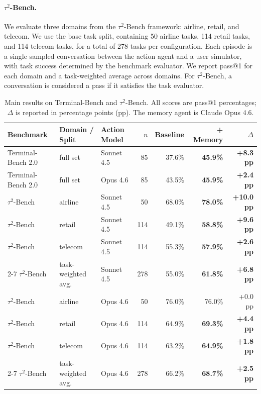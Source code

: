 \paragraph{$\tau^2$-Bench.}
We evaluate three domains from the $\tau^2$-Bench framework: airline, retail, and
telecom. We use the base task split, containing 50 airline tasks, 114 retail
tasks, and 114 telecom tasks, for a total of 278 tasks per configuration. Each
episode is a single sampled conversation between the action agent and a user
simulator, with task success determined by the benchmark evaluator. We report
pass@1 for each domain and a task-weighted average across domains.
For $\tau^2$-Bench, a conversation is considered a pass if it satisfies the task evaluator.

\begin{table}[t]
\centering
\small
\setlength{\tabcolsep}{6pt}
\caption{
Main results on Terminal-Bench and $\tau^2$-Bench. All scores are pass@1
percentages; $\Delta$ is reported in percentage points (pp). The memory agent
is Claude Opus 4.6.
}
\label{tab:main_results}
\begin{tabular}{lllrrrr}
\toprule
Benchmark & Domain / Split & Action Model & $n$
& Baseline & + Memory & $\Delta$ \\
\midrule
Terminal-Bench 2.0 & full set & Sonnet 4.5 & 85
& 37.6\% & \textbf{45.9\%} & \textbf{+8.3 pp} \\
Terminal-Bench 2.0 & full set & Opus 4.6 & 85
& 43.5\% & \textbf{45.9\%} & \textbf{+2.4 pp} \\
\midrule
$\tau^2$-Bench & airline & Sonnet 4.5 & 50
& 68.0\% & \textbf{78.0\%} & \textbf{+10.0 pp} \\
$\tau^2$-Bench & retail & Sonnet 4.5 & 114
& 49.1\% & \textbf{58.8\%} & \textbf{+9.6 pp} \\
$\tau^2$-Bench & telecom & Sonnet 4.5 & 114
& 55.3\% & \textbf{57.9\%} & \textbf{+2.6 pp} \\
\cmidrule(lr){2-7}
$\tau^2$-Bench & task-weighted avg. & Sonnet 4.5 & 278
& 55.0\% & \textbf{61.8\%} & \textbf{+6.8 pp} \\
\midrule
$\tau^2$-Bench & airline & Opus 4.6 & 50
& 76.0\% & 76.0\% & +0.0 pp \\
$\tau^2$-Bench & retail & Opus 4.6 & 114
& 64.9\% & \textbf{69.3\%} & \textbf{+4.4 pp} \\
$\tau^2$-Bench & telecom & Opus 4.6 & 114
& 63.2\% & \textbf{64.9\%} & \textbf{+1.8 pp} \\
\cmidrule(lr){2-7}
$\tau^2$-Bench & task-weighted avg. & Opus 4.6 & 278
& 66.2\% & \textbf{68.7\%} & \textbf{+2.5 pp} \\
\bottomrule
\end{tabular}
\end{table}
